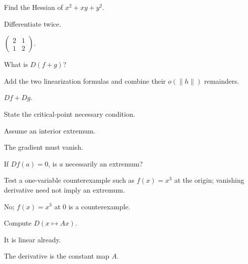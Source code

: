 \begin{exercise}\label{exr:ii08-04}
Find the Hessian of $x^2+xy+y^2$.
\end{exercise}
\begin{hint}
Differentiate twice.
\end{hint}
\begin{solution}
$\begin{pmatrix}2&1\\1&2\end{pmatrix}$.
\end{solution}

\begin{exercise}\label{exr:ii08-05}
What is $D(f+g)$?
\end{exercise}
\begin{hint}
Add the two linearization formulas and combine their \(o(\lVert h\rVert)\) remainders.
\end{hint}
\begin{solution}
$Df+Dg$.
\end{solution}

\begin{exercise}\label{exr:ii08-06}
State the critical-point necessary condition.
\end{exercise}
\begin{hint}
Assume an interior extremum.
\end{hint}
\begin{solution}
The gradient must vanish.
\end{solution}

\begin{exercise}\label{exr:ii08-07}
If $Df(a)=0$, is $a$ necessarily an extremum?
\end{exercise}
\begin{hint}
Test a one-variable counterexample such as \(f(x)=x^3\) at the origin; vanishing derivative need not imply an extremum.
\end{hint}
\begin{solution}
No; $f(x)=x^3$ at $0$ is a counterexample.
\end{solution}

\begin{exercise}\label{exr:ii08-08}
Compute $D(x\mapsto Ax)$.
\end{exercise}
\begin{hint}
It is linear already.
\end{hint}
\begin{solution}
The derivative is the constant map $A$.
\end{solution}


